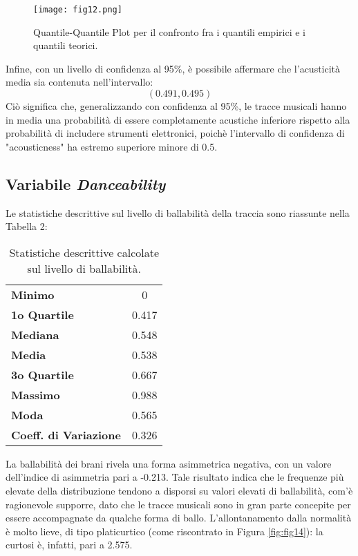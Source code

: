 \documentclass[fleqn,10pt]{SelfArx} %
\begin{document}
\begin{figure}[H]
    \centering
    \texttt{[image: fig12.png]}
    \caption{Quantile-Quantile Plot per il confronto fra i quantili empirici e i quantili teorici.}
    \label{fig:fig12}
\end{figure}
Infine, con un livello di confidenza al 95\%, è possibile affermare che l'acusticità media sia contenuta nell'intervallo:
\begin{equation}
    (0.491, 0.495)
\end{equation}
Ciò significa che, generalizzando con confidenza al 95\%, le tracce musicali hanno in media una probabilità di essere completamente acustiche inferiore rispetto alla probabilità di includere strumenti elettronici, poichè l'intervallo di confidenza di "acousticness" ha estremo superiore minore di 0.5. 
\subsection*{Variabile \textit{Danceability}}
Le statistiche descrittive sul livello di ballabilità della traccia sono riassunte nella Tabella 2:
{\begin{table}[H]
\centering

\begin{tabular}[t]{lc}
\toprule
\midrule
\textbf{Minimo}&0\\
\textbf{1o Quartile}&0.417\\
\textbf{Mediana}&0.548\\
\textbf{Media}&0.538\\
\textbf{3o Quartile}&0.667\\
\textbf{Massimo}&0.988\\
\textbf{Moda}&0.565\\
\textbf{Coeff. di Variazione}&0.326\\
\bottomrule
\end{tabular}
\caption{Statistiche descrittive calcolate sul livello di ballabilità.}
\end{table}}
La ballabilità dei brani rivela una forma asimmetrica negativa, con un valore dell'indice di asimmetria pari a -0.213. Tale risultato indica che le frequenze più elevate della distribuzione tendono a disporsi su valori elevati di ballabilità, com'è ragionevole supporre, dato che le tracce musicali sono in gran parte concepite per essere accompagnate da qualche forma di ballo. L'allontanamento dalla normalità è molto lieve, di tipo platicurtico (come riscontrato in Figura \ref{fig:fig14}): la curtosi è, infatti, pari a 2.575.\\
\end{document}
